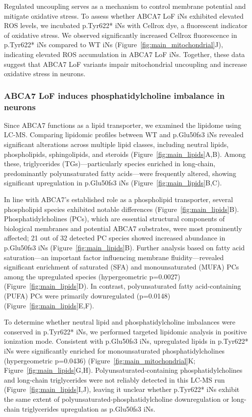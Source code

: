 Regulated uncoupling serves as a mechanism to control membrane potential and mitigate oxidative stress. To assess whether ABCA7 LoF iNs exhibited elevated ROS levels, we incubated p.Tyr622* iNs with Cellrox dye, a fluorescent indicator of oxidative stress. We observed significantly increased Cellrox fluorescence in p.Tyr622* iNs compared to WT iNs (Figure~\ref{fig:main_mitochondrial}J), indicating elevated ROS accumulation in ABCA7 LoF iNs. Together, these data suggest that ABCA7 LoF variants impair mitochondrial uncoupling and increase oxidative stress in neurons.

\subsubsection{ABCA7 LoF induces phosphatidylcholine imbalance in neurons}
Since ABCA7 functions as a lipid transporter, we examined the lipidome using LC-MS. Comparing lipidomic profiles between WT and p.Glu50fs3 iNs revealed significant alterations across multiple lipid classes, including neutral lipids, phospholipids, sphingolipids, and steroids (Figure~\ref{fig:main_lipids}A,B). Among these, triglycerides (TGs)—particularly species enriched in long-chain, predominantly polyunsaturated fatty acids—were frequently altered, showing significant upregulation in p.Glu50fs3 iNs (Figure~\ref{fig:main_lipids}B,C).

In line with ABCA7's established role as a phospholipid transporter, several phospholipid species exhibited notable differences (Figure~\ref{fig:main_lipids}B). Phosphatidylcholines (PCs), which are essential structural components of biological membranes and potential ABCA7 substrates, were most prominently affected; 21 out of 32 detected PC species showed increased abundance in p.Glu50fs3 iNs (Figure~\ref{fig:main_lipids}B). Further analysis based on fatty acid saturation—an important factor influencing membrane fluidity—revealed significant enrichment of saturated (SFA) and monounsaturated (MUFA) PCs among the upregulated species (hypergeometric p=0.0027) (Figure~\ref{fig:main_lipids}D). In contrast, polyunsaturated fatty acid-containing (PUFA) PCs were primarily downregulated (p=0.0148) (Figure~\ref{fig:main_lipids}E,F).

To determine whether neutral lipid and phosphatidylcholine imbalances were conserved in p.Tyr622* iNs, we performed targeted lipidomic analysis in positive ionization mode. Consistent with p.Glu50fs3 iNs, upregulated lipids in p.Tyr622* iNs were significantly enriched for monounsaturated phosphatidylcholines (hypergeometric p=0.0436) (Figure~\ref{fig:main_mitochondrial}K; Figure~\ref{fig:main_lipids}G,H). Polyunsaturated-containing phosphatidylcholines and long-chain triglycerides were not reliably detected in this LC-MS run (Figure~\ref{fig:main_lipids}I,J), leaving it unclear whether p.Tyr622* iNs exhibit the same extent of polyunsaturated-phosphatidylcholine downregulation or long-chain triglycerides upregulation as p.Glu50fs3 iNs.


